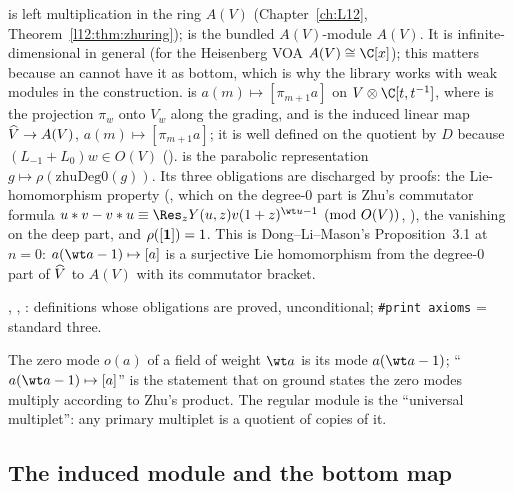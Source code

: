 \begin{dictionary}
 is left multiplication in the ring $A(V)$ (Chapter~\ref{ch:L12},
Theorem~\ref{l12:thm:zhuring});  is the bundled $A(V)$-module $A(V)$. It is infinite-dimensional in
general (for the Heisenberg VOA $A(V)\cong\C[x]$); this matters because an  cannot have it as bottom,
which is why the library works with weak modules in the construction.  is $a(m)\mapsto[\pi_{m+1}a]$ on $V\otimes\C[t,t^{-1}]$, where  is the projection $\pi_w$ onto $V_w$ along the grading, and  is the induced linear map
$\widehat{V}\to A(V)$, $a(m)\mapsto[\pi_{m+1}a]$; it is well defined on the quotient by $D$ because
$(L_{-1}+L_0)w\in O(V)$ ().  is the parabolic representation
$g\mapsto\rho(\text{zhuDeg0}(g))$. Its three obligations are discharged by proofs: the Lie-homomorphism property
(, which on the degree-$0$ part is Zhu's commutator formula
$u*v-v*u\equiv\Res_zY(u,z)v(1+z)^{\wt u-1}\pmod{O(V)}$, ), the vanishing on the deep part, and
$\rho([\mathbf{1}]) = 1$. This is Dong--Li--Mason's Proposition~3.1 at $n=0$: $a(\wt a-1)\mapsto[a]$ is a surjective
Lie homomorphism from the degree-$0$ part of $\widehat{V}$ to $A(V)$ with its commutator bracket.
\end{dictionary}

\begin{status}
, , : definitions whose obligations are proved, unconditional;
\texttt{\#print axioms} = standard three.
\end{status}

\begin{physics}
The zero mode $o(a)$ of a field of weight $\wt a$ is its mode $a(\wt a-1)$; ``$a(\wt a-1)\mapsto[a]$'' is the
statement that on ground states the zero modes multiply according to Zhu's product. The regular module is the
``universal multiplet'': any primary multiplet is a quotient of copies of it.
\end{physics}

\subsection{The induced module and the bottom map}


